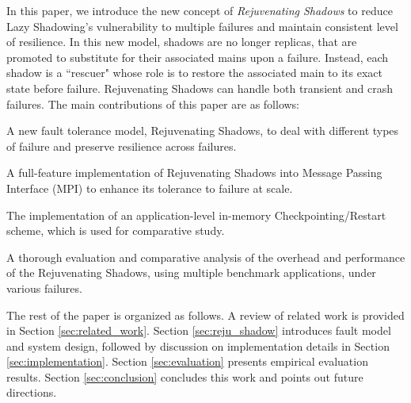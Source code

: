 In this paper, we introduce the new concept of {\it Rejuvenating Shadows} to reduce Lazy Shadowing's vulnerability to multiple failures and maintain consistent level of resilience. In this new model, shadows are no longer replicas, that are promoted to substitute for their associated mains upon a failure. Instead, each shadow is a ``rescuer" whose role is to restore the associated main to its exact state before failure. Rejuvenating Shadows can handle both transient and crash failures. The main contributions of this paper are as follows:


\begin{itemize}
{
	\item A new fault tolerance model, Rejuvenating Shadows, to deal with different types of failure and preserve resilience across failures.
   \item A full-feature implementation of Rejuvenating Shadows into Message Passing Interface (MPI) to enhance its tolerance to failure at scale.
   \item The implementation of an application-level in-memory Checkpointing/Restart scheme, which is used for comparative study.
   \item A thorough evaluation and comparative analysis of the overhead and performance of the Rejuvenating Shadows, using multiple benchmark applications, under various failures.
}
\end{itemize}

The rest of the paper is organized as follows. A review of related work is provided in Section 
\ref{sec:related_work}. Section \ref{sec:reju_shadow} introduces fault model and system design, followed by discussion on implementation details in Section \ref{sec:implementation}.
Section \ref{sec:evaluation} presents empirical evaluation results. Section \ref{sec:conclusion} concludes this work and points out future directions.



